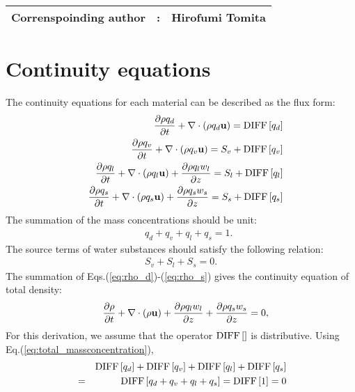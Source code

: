 {\bf \Large
\begin{tabular}{ccc}
\hline
  Correnspoinding author & : & Hirofumi Tomita\\
\hline
\end{tabular}
}

\section{Continuity equations}

The continuity equations for each material can be described as the flux form:
\begin{eqnarray}
&&  \frac{\partial \rho q_d}{\partial t}
+ \nabla \cdot\left(\rho q_d{\bf u}\right)  = {\rm DIFF}\left[q_d\right]
\label{eq:rho_d}\\
&&  \frac{\partial \rho q_v}{\partial t}
+ \nabla \cdot\left(\rho q_v {\bf u}\right)  = S_v + {\rm DIFF}\left[q_v\right]
\label{eq:rho_v}\\
&&  \frac{\partial \rho q_l}{\partial t}
+ \nabla \cdot\left(\rho q_l {\bf u}\right)
+ \frac{\partial \rho q_l w_l}{\partial z}=S_l + {\rm DIFF}\left[q_l\right]
\label{eq:rho_l}\\
&&  \frac{\partial \rho q_s}{\partial t}
+ \nabla \cdot\left(\rho q_s {\bf u}\right)
+ \frac{\partial \rho q_s w_s}{\partial z}=S_s + {\rm DIFF}\left[q_s\right]
\label{eq:rho_s}
\end{eqnarray}
The summation of the mass concentrations should be unit:
\begin{eqnarray}
&& q_d + q_v + q_l + q_s = 1. \label{eq:total_massconcentration}
\end{eqnarray}
The source terms of water substances should satisfy the following relation:
\begin{eqnarray}
  S_v + S_l + S_s = 0.
\end{eqnarray}
The summation of Eqs.(\ref{eq:rho_d})-(\ref{eq:rho_s}) gives the
continuity equation of total density:
\begin{eqnarray}
&&  \frac{\partial \rho}{\partial t}
+ \nabla\cdot\left(\rho{\bf u}\right)
+ \frac{\partial \rho q_l w_l}{\partial z}
+ \frac{\partial \rho q_s w_s}{\partial z}
=0, \label{eq:rhotot}
\end{eqnarray}
For this derivation,
we assume that
the operator ${ \rm DIFF}\left[\right]$ is distributive.
Using Eq.(\ref{eq:total_massconcentration}),
\begin{eqnarray}
&&  { \rm DIFF}\left[q_d\right]
+{ \rm DIFF}\left[q_v\right]
+{ \rm DIFF}\left[q_l\right]
+{ \rm DIFF}\left[q_s\right]\nonumber\\
&=&{ \rm DIFF}\left[q_d+q_v+q_l+q_s\right]
={ \rm DIFF}\left[1\right] = 0
\end{eqnarray}

